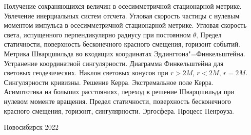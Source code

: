\documentclass[12pt,pagesize,paper=192mm:108mm,landscape]{scrbook}
\begin{document}
\begin{titlepage}
  \vspace*{-0.5em}
  \begin{center}    

    



     \vfill

     \normalsize
     \begin{minipage}{0.8\linewidth}
      Получение сохраняющихся величин в осесимметричной стационарной
      метрике. Увлечение инерциальных систем отсчета. Угловая скорость
      частицы с нулевым моментом импульса в осесимметричной
      стационарной метрике. Угловая скорость света, испущенного
      перпендикулярно радиусу при постоянном $\theta$, Предел
      статичности, поверхность бесконечного красного смещения,
      горизонт событий. Метрика Шварцшильда во входящих координатах
      Эддингтона"=Финкельштейна. Устранение координатной
      сингулярности. Диаграмма Финкельштейна для световых
      геодезических. Наклон световых конусов при $r>2M$, $r<2M$,
      $r=2M$. Сингулярности кривизны. Решение Керра. Экстремальное
      поле Керра. Асимптотика на больших расстояниях, переход в
      решение Шварцшильда при нулевом моменте вращения. Предел
      статичности, поверхность бесконечного красного смещения,
      горизонт, сингулярности. Эргосфера. Процесс Пенроуза.

     \end{minipage}
    \vfill

    \normalsize \ccbysa\hspace{0.5em}  Новосибирск 2022
  \end{center}
\end{titlepage}
\end{document}
